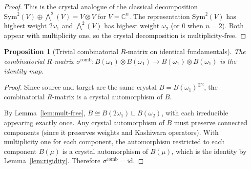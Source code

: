 \documentclass[11pt]{article}
\newtheorem{proposition}[theorem]{Proposition}
\theoremstyle{remark}
\newcommand{\CC}{\mathbb{C}}
\newcommand{\id}{\mathrm{id}}
\begin{document}
\begin{proof}
This is the crystal analogue of the classical decomposition
$\mathrm{Sym}^2(V) \oplus \bigwedge^2(V) = V \otimes V$ for
$V = \CC^n$. The representation $\mathrm{Sym}^2(V)$ has highest weight
$2\omega_1$ and $\bigwedge^2(V)$ has highest weight $\omega_2$ (or $0$
when $n = 2$). Both appear with multiplicity one, so the crystal
decomposition is multiplicity-free.
\end{proof}

\begin{proposition}[Trivial combinatorial $R$-matrix on identical fundamentals]
\label{prop:trivial-R}
The combinatorial $R$-matrix
$\sigma^{\mathrm{comb}}\colon B(\omega_1) \otimes B(\omega_1) \to
B(\omega_1) \otimes B(\omega_1)$
is the identity map.
\end{proposition}

\begin{proof}
Since source and target are the same crystal $B = B(\omega_1)^{\otimes 2}$,
the combinatorial $R$-matrix is a crystal automorphism of $B$.

By Lemma~\ref{lem:mult-free}, $B \cong B(2\omega_1) \sqcup B(\omega_2)$,
with each irreducible appearing exactly once. Any crystal automorphism
of $B$ must preserve connected components (since it preserves weights
and Kashiwara operators). With multiplicity one for each component,
the automorphism restricted to each component $B(\mu)$ is a crystal
automorphism of $B(\mu)$, which is the identity by
Lemma~\ref{lem:rigidity}. Therefore $\sigma^{\mathrm{comb}} = \id$.
\end{proof}
\end{document}
